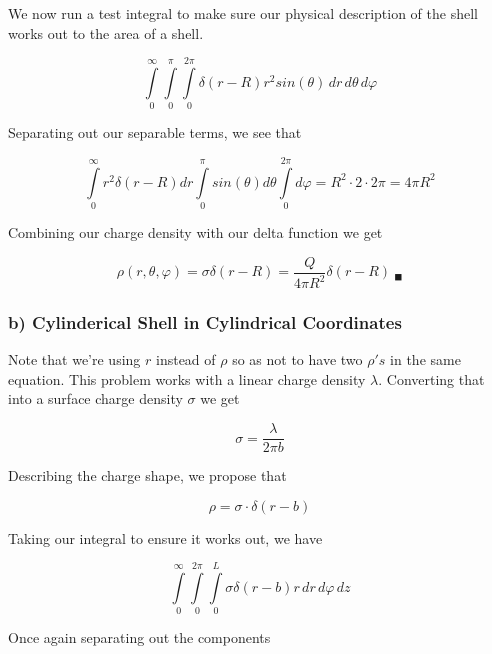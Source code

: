 We now run a test integral to make sure our physical description of
the shell works out to the area of a shell.

\begin{equation}
  \int\limits_0^\infty \int\limits_0^\pi \int\limits_0^{2\pi}
  \delta(r-R) r^2sin(\theta)\, dr\, d\theta\, d\varphi
\end{equation}

Separating out our separable terms, we see that

\begin{equation}
  \int\limits_0^\infty r^2\delta(r-R) dr
  \int\limits_0^\pi sin(\theta) d\theta
  \int\limits_0^{2\pi} d\varphi
  = R^2 \cdot 2 \cdot 2\pi
  = 4\pi{}R^2
\end{equation}

Combining our charge density with our delta function we get

\begin{equation}
  \rho(r, \theta, \varphi) = \sigma\delta(r-R) = \frac{Q}{4\pi{}R^2}\delta(r-R)
  \ _\blacksquare
\end{equation}

\subsubsection*{b) Cylinderical Shell in Cylindrical Coordinates}

Note that we're using $r$ instead of $\rho$ so as not to have two
$\rho's$ in the same equation.  This problem works with a linear
charge density $\lambda$.  Converting that into a surface charge
density $\sigma$ we get

\begin{equation}
  \sigma = \frac{\lambda}{2 \pi{} b}
\end{equation}

Describing the charge shape, we propose that

\begin{equation}
  \rho = \sigma \cdot \delta(r - b)
\end{equation}

Taking our integral to ensure it works out, we have

\begin{equation}
  \int\limits_0^\infty
  \int\limits_0^{2\pi}
  \int\limits_0^L
  \sigma \delta(r-b)
  r
  \,dr
  \,d\varphi
  \,dz
\end{equation}

Once again separating out the components

